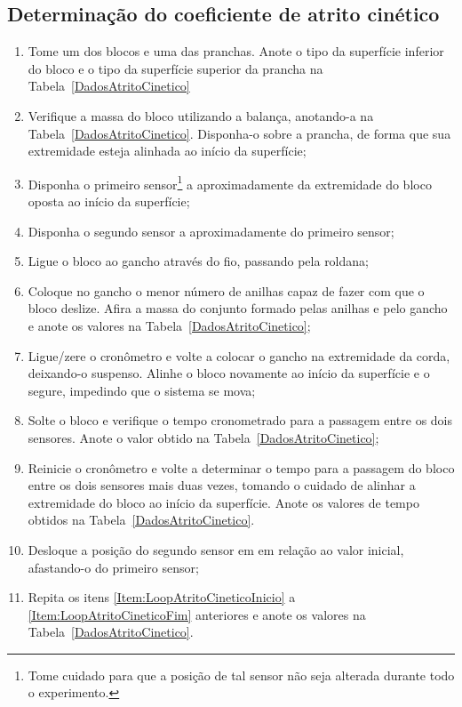 \subsection{Determinação do coeficiente de atrito cinético}
\begin{enumerate}
    \item Tome um dos blocos e uma das pranchas. Anote o tipo da superfície inferior do bloco e o tipo da superfície superior da prancha na Tabela~\ref{DadosAtritoCinetico}
    \item Verifique a massa do bloco utilizando a balança, anotando-a na Tabela~\ref{DadosAtritoCinetico}. Disponha-o sobre a prancha, de forma que sua extremidade esteja alinhada ao início da superfície;
    \item Disponha o primeiro sensor\footnote{Tome cuidado para que a posição de tal sensor não seja alterada durante todo o experimento.} a aproximadamente  da extremidade do bloco oposta ao início da superfície;
    \item Disponha o segundo sensor a aproximadamente  do primeiro sensor;
    \item Ligue o bloco ao gancho através do fio, passando pela roldana;
    \item Coloque no gancho o menor número de anilhas capaz de fazer com que o bloco deslize. Afira a massa do conjunto formado pelas anilhas e pelo gancho e anote os valores na Tabela~\ref{DadosAtritoCinetico};
    \item Ligue/zere o cronômetro e volte a colocar o gancho na extremidade da corda, deixando-o suspenso. Alinhe o bloco novamente ao início da superfície e o segure, impedindo que o sistema se mova;\label{Item:LoopAtritoCineticoInicio}
    \item Solte o bloco e verifique o tempo cronometrado para a passagem entre os dois sensores. Anote o valor obtido na Tabela~\ref{DadosAtritoCinetico};
    \item Reinicie o cronômetro e volte a determinar o tempo para a passagem do bloco entre os dois sensores mais duas vezes, tomando o cuidado de alinhar a extremidade do bloco ao início da superfície. Anote os valores de tempo obtidos na Tabela~\ref{DadosAtritoCinetico}.
    \item Desloque a posição do segundo sensor em  em relação ao valor inicial, afastando-o do primeiro sensor;\label{Item:LoopAtritoCineticoFim}
    \item Repita os itens \ref{Item:LoopAtritoCineticoInicio} a \ref{Item:LoopAtritoCineticoFim} anteriores e anote os valores na Tabela~\ref{DadosAtritoCinetico}.

\end{enumerate}
